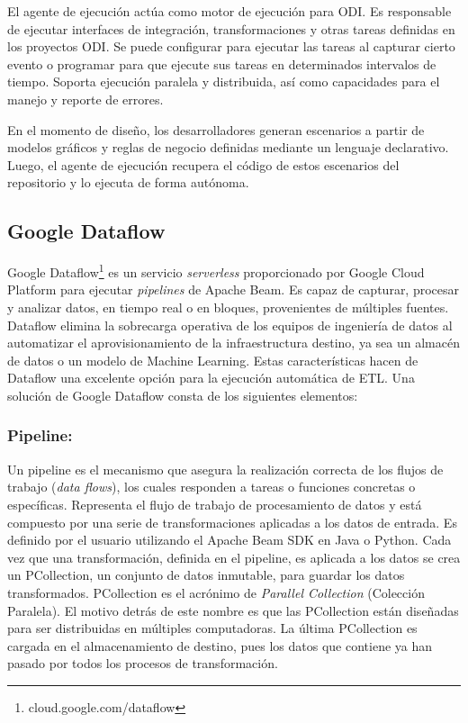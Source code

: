 El agente de ejecución actúa como motor de ejecución para ODI. Es responsable de ejecutar interfaces de integración, 
transformaciones y otras tareas definidas en los proyectos ODI. Se puede configurar para ejecutar las tareas al capturar 
cierto evento o programar para que ejecute sus tareas en determinados intervalos de tiempo. Soporta ejecución paralela
y distribuida, as\'i como capacidades para el manejo y reporte de errores.

En el momento de diseño, los desarrolladores generan escenarios a partir de modelos gráficos y reglas de negocio 
definidas mediante un lenguaje declarativo. Luego, el agente de ejecución recupera el código de estos escenarios 
del repositorio y lo ejecuta de forma autónoma. 





\subsection{Google Dataflow}

Google Dataflow\footnote{cloud.google.com/dataflow} es un servicio \emph{serverless} proporcionado por Google Cloud Platform para ejecutar \emph{pipelines} de Apache Beam. 
Es capaz de capturar, procesar y analizar datos, en tiempo real o en bloques, provenientes de m\'ultiples fuentes.
Dataflow elimina la sobrecarga operativa de los equipos de ingeniería de datos al automatizar el aprovisionamiento de la
infraestructura destino, ya sea un almacén de datos o un modelo de Machine Learning. Estas características hacen de 
Dataflow una excelente opción para la ejecución automática de ETL. Una solución de Google Dataflow consta de los 
siguientes elementos:

\subsubsection{Pipeline:}

Un pipeline es el mecanismo que asegura la realización correcta de los flujos de trabajo (\emph{data flows}), los cuales responden a 
tareas o funciones concretas o específicas. Representa el flujo de trabajo de procesamiento de datos y est\'a 
compuesto por una serie de transformaciones aplicadas a los datos de entrada. Es definido por el usuario utilizando el 
Apache Beam SDK en Java o Python. Cada vez que una transformación, definida en el pipeline, es aplicada a los datos se crea 
un PCollection, un conjunto de datos inmutable, para guardar los datos transformados. PCollection es el acrónimo de 
\emph{Parallel Collection} (Colección 
Paralela). El motivo detrás de este nombre es que las PCollection están diseñadas para ser distribuidas en múltiples 
computadoras. La \'ultima PCollection es cargada en el almacenamiento de destino, pues los datos que contiene ya han pasado 
por todos los procesos de transformación. 

